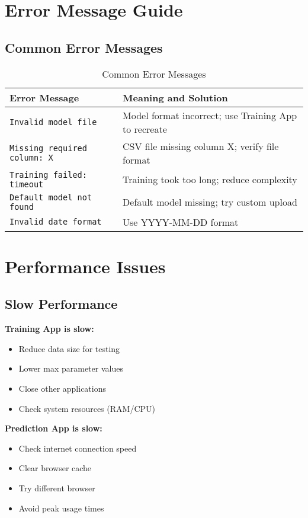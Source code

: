 \section{Error Message Guide}

\subsection{Common Error Messages}

\begin{table}[h]
	\centering
	\begin{tabular}{|p{}|p{}|}
		\hline
		\textbf{Error Message} & \textbf{Meaning and Solution} \\
		\hline
		\texttt{Invalid model file} & Model format incorrect; use Training App to recreate \\
		\hline
		\texttt{Missing required column: X} & CSV file missing column X; verify file format \\
		\hline
		\texttt{Training failed: timeout} & Training took too long; reduce complexity \\
		\hline
		\texttt{Default model not found} & Default model missing; try custom upload \\
		\hline
		\texttt{Invalid date format} & Use YYYY-MM-DD format \\
		\hline
	\end{tabular}
	\caption{Common Error Messages}
\end{table}

\section{Performance Issues}

\subsection{Slow Performance}

\textbf{Training App is slow:}
\begin{itemize}
	\item Reduce data size for testing
	\item Lower max parameter values
	\item Close other applications
	\item Check system resources (RAM/CPU)
\end{itemize}

\textbf{Prediction App is slow:}
\begin{itemize}
	\item Check internet connection speed
	\item Clear browser cache
	\item Try different browser
	\item Avoid peak usage times
\end{itemize}

